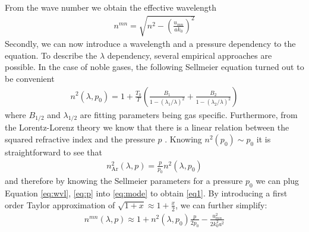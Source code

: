 \documentclass[fleqn, 10pt, twocolumn]{SelfArx}
\begin{document}
    From the wave number we obtain the effective wavelength
    \begin{align}
        n^{mn} = \sqrt{n^2 - \left( \frac{u_{mn}}{a k_0}\right)^2}
        \label{eq:mode}
    \end{align}
    Secondly, we can now introduce a wavelength and a pressure dependency to the equation. To describe the $\lambda$ dependency, several empirical approaches are possible. 
    In the case of noble gases, the following Sellmeier equation turned out to be convenient \cite{Borzsonyi2008}
    \begin{align}
       n^2(\lambda, p_0)  = 1 + \frac{T_0}{T} \left(\frac{B_1}{1- (\lambda_1/\lambda)^2} + \frac{B_2}{1- (\lambda_2/\lambda)^2}  \right)
        \label{eq:wvl}
    \end{align}
    where $B_{1/2}$ and $\lambda_{1/2}$ are fitting parameters being gas specific.
    Furthermore, from the Lorentz-Lorenz theory
    we know that there is a linear relation between the squared refractive index and the pressure $p$ \cite{Borzsonyi2008}.
    Knowing $n^2(p_0) \sim p_0$ it is straightforward to see that
    \begin{align}
        n_{\text{Ar}}^2(\lambda, p) = \frac{p}{p_0} n^2(\lambda, p_0)
        \label{eq:p}
    \end{align}
    and therefore by knowing the Sellmeier parameters for a pressure $p_0$ we can plug Equation \ref{eq:wvl}, \ref{eq:p} into \ref{eq:mode} to obtain \autoref{eq1}. 
    By introducing a first order Taylor approximation of $\sqrt{1+x} \approx 1 + \frac{x}{2}$, we can further simplify:
    \begin{align}
        n^{mn}(\lambda, p) \approx 1 + n^2(\lambda, p_0) \frac{p}{2p_0} -  \frac{u_{mn}^2}{2 k_0^2 a^2}
        \label{eq1a}
    \end{align}
\end{document}
